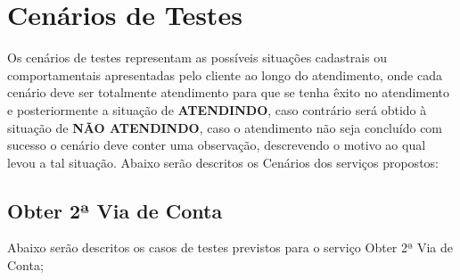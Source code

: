 \section{Cenários de Testes}

Os cenários de testes representam as possíveis situações cadastrais ou comportamentais apresentadas pelo cliente ao longo do atendimento, onde cada cenário deve ser totalmente atendimento para que se tenha êxito no atendimento e posteriormente a situação de \textbf{ATENDINDO}, caso contrário será obtido à situação de \textbf{NÃO ATENDINDO}, caso o atendimento não seja concluído com sucesso o cenário deve conter uma observação, descrevendo o motivo ao qual levou a tal situação.
Abaixo serão descritos os Cenários dos serviços propostos:

\subsection{Obter 2ª Via de Conta}
Abaixo serão descritos os casos de testes previstos para o serviço Obter 2ª Via de Conta;

